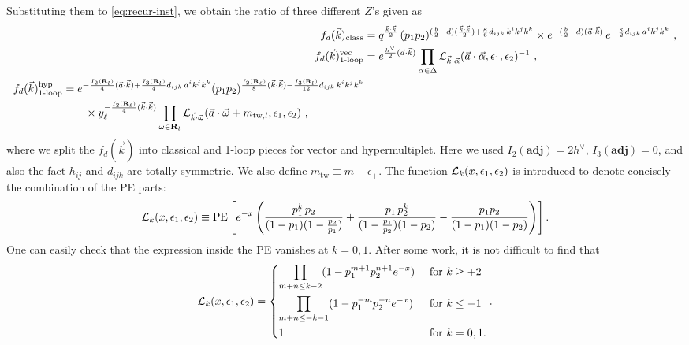 \documentclass[letterpaper, 11pt]{article}
\def\CL{{\cal L}}
\def\a{\alpha}
\def\e{\epsilon}
\def\k{\kappa}
\def\w{\omega}
\def\D{\Delta}
\begin{document}
Substituting them to \eqref{eq:recur-inst}, we obtain the ratio of three different $Z$'s given as
\begin{align}
 f_d(\vec{k})_{\text{class}} &=  q^{\frac{\vec{k}\cdot\vec{k}}{2} } \, 
  (p_1p_2)^{(\frac{b}{2}-d) (\frac{\vec{k}\cdot\vec{k}}{2}) +\frac{\k}{6}d_{ijk}\,k^ik^jk^k} \times  e^{-(\frac{b}{2}-d)(\vec{a}\cdot\vec{k})}\,
  e^{-\frac{\kappa}{2}d_{ijk}\,a^ik^jk^k} \ , \\
  f_d(\vec{k})_{\text{1-loop}}^{\text{vec}}&= e^{\frac{h^\vee}{2}(\vec{a}\cdot\vec{k})}  \prod_{\a \in \D} \CL_{\vec{k} \cdot \vec{\a}} (\vec{a}\cdot\vec{\alpha}, \epsilon_1, \epsilon_2)^{-1} \ , \\
 \begin{split}
  f_d(\vec{k})_{\text{1-loop}}^{\text{hyp}} &= e^{-\frac{I_2(\mathbf{R}_l)}{4}(\vec{a}\cdot\vec{k})+\frac{I_3(\mathbf{R}_l)}{4}d_{ijk}\,a^ik^jk^k} (p_1p_2)^{\frac{I_2(\mathbf{R}_\ell)}{8}(\vec{k}\cdot\vec{k})-\frac{I_3(\mathbf{R}_l)}{12}d_{ijk}\,k^ik^jk^k} \\
   &\qquad \times   y_\ell^{-\frac{I_2(\mathbf{R}_\ell)}{4}(\vec{k}\cdot\vec{k})} \prod_{\w \in \mathbf{R}_l} \CL_{\vec{k}\cdot\vec{\w}}(\vec{a}\cdot \vec{\w} + m_{\text{tw},l}, \e_1,\e_2) \ , 
\end{split}
\end{align}
where we split the $f_d(\vec{k})$ into classical and 1-loop pieces for vector and hypermultiplet. 
Here we used $I_2(\textbf{adj}) = 2h^\vee$, $I_3(\textbf{adj})=0$, and also 
the fact $h_{ij}$ and $d_{ijk}$ are totally symmetric. We also define $m_{\text{tw}} \equiv m - \e_+$. The function $\CL_k (x,\e_1,\e_2)$ is introduced to denote concisely the combination of the PE parts:
\begin{align}
  \CL_k (x,\e_1,\e_2) \equiv \text{PE}\left[ e^{-x} \left(\frac{p_1^k \, p_2}{(1-p_1)(1-\frac{p_2}{p_1})}+\frac{p_1\, p_2^k}{(1-\frac{p_1}{p_2})(1-p_2)}-\frac{p_1p_2}{(1-p_1)(1-p_2)}\right) \right].
\end{align}
One can easily check that the expression inside the PE vanishes at $k=0, 1$. After some work, it is not difficult to find that 
\begin{align}
  \CL_k (x,\e_1,\e_2) =
   \begin{dcases}
   \prod_{m+n \le k-2}(1-p_1^{m+1} p_2^{n+1}e^{-x}) & \text{ for } k\geq +2 \\
   \prod_{m+n \le -k-1}(1-p_1^{-m} p_2^{-n}e^{-x}) & \text{ for } k\leq-1 \\
   1 & \text{ for } k=0, 1.
   \end{dcases} . 
\end{align}
\end{document}
